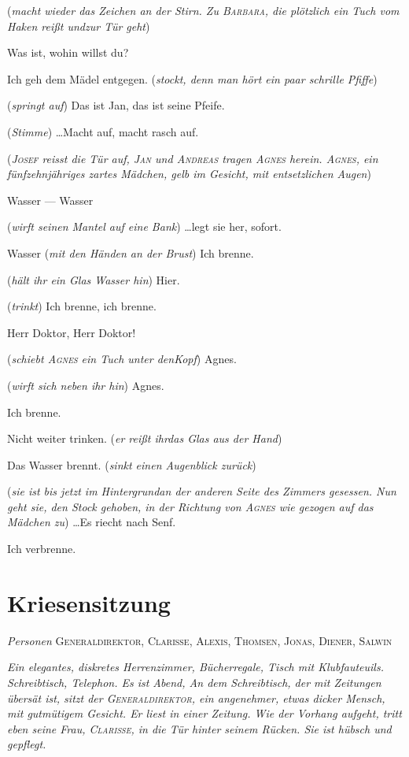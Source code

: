 \documentclass[
	final,
	a4paper,
	ngerman,
	mpinclude = true, %
	twoside = true,
	open = right,
	cleardoublepage = plain,
	DIV = 13,
	BCOR = 1cm,
	titlepage = firstiscover,
	]{scrbook}
\newcommand{\marginnote}[1]{\marginpar{\singlespacing\raggedright\footnotesize#1}}
\newcommand{\scene}{\setcounter{subscene}{1}\section}
\newcommand{\direction}[1]{(\textit{#1})}
\newcommand{\setting}[1]{\vspace{-0.5\baselineskip}\centering\textit{#1}}
\newcounter{subscene}
\newcommand{\characterlist}[1]{{\begin{center}\textit{Personen} #1\end{center}}}
\newcommand{\thecharacter}[1]{\textup{\textsc{#1}}\xspace}
\newcommand{\theBarbara}{\thecharacter{Barbara}}
\newcommand{\theJosef}{\thecharacter{Josef}}
\newcommand{\theKathrine}{\thecharacter{Kathrine}}
\newcommand{\theJan}{\thecharacter{Jan}}
\newcommand{\theAndreas}{\thecharacter{Andreas}}
\newcommand{\theLuise}{\thecharacter{Luise}}
\newcommand{\theAgnes}{\thecharacter{Agnes}}
\newcommand{\theGeneraldirektor}{\thecharacter{Generaldirektor}}
\newcommand{\theClarisse}{\thecharacter{Clarisse}}
\newcommand{\theAlexis}{\thecharacter{Alexis}}
\newcommand{\theThomsen}{\thecharacter{Thomsen}}
\newcommand{\theJonas}{\thecharacter{Jonas}}
\newcommand{\theSalwin}{\thecharacter{Salwin}}
\newcommand{\theDiener}{\thecharacter{Diener}}
\newcommand{\character}[1]{\item[#1]}
\newcommand{\Barbara}{\character{\theBarbara}}
\newcommand{\Josef}{\character{\theJosef}}
\newcommand{\Kathrine}{\character{\theKathrine}}
\newcommand{\Andreas}{\character{\theAndreas}}
\newcommand{\Luise}{\character{\theLuise}}
\newcommand{\Agnes}{\character{\theAgnes}}
\newcommand{\Thomsen}{\character{\theThomsen}}
\begin{document}
\begin{play}
\direction{macht wieder das Zeichen an der Stirn. Zu \theBarbara, die plötzlich ein Tuch vom Haken reißt undzur Tür geht}

Was ist, wohin willst du?

\Barbara
Ich geh dem Mädel entgegen. \direction{stockt, denn man hört ein paar schrille Pfiffe}

\Luise
\direction{springt auf} Das ist Jan, das ist seine Pfeife.

\Andreas
\direction{Stimme}
\ldots Macht auf, macht rasch auf.

\direction{\theJosef reisst die Tür auf, \theJan und \theAndreas tragen \theAgnes herein. \theAgnes, ein fünfzehnjähriges zartes Mädchen, gelb im Gesicht, mit entsetzlichen Augen}

\Agnes
Wasser --- Wasser

\Thomsen
\direction{wirft seinen Mantel auf eine Bank} \ldots legt sie her, sofort.

\Agnes
Wasser \direction{mit den Händen an der Brust} Ich brenne.

\Luise
\direction{hält ihr ein Glas Wasser hin} Hier.

\Agnes
\direction{trinkt} Ich brenne, ich brenne.

\Josef
Herr Doktor, Herr Doktor!

\Barbara
\direction{schiebt \theAgnes ein Tuch unter denKopf} Agnes.

\Andreas
\direction{wirft sich neben ihr hin} Agnes.

\Agnes
Ich brenne.

\Thomsen
Nicht weiter trinken. \direction{er reißt ihrdas Glas aus der Hand}

\Agnes
Das Wasser brennt. \direction{sinkt einen Augenblick zurück}

\Kathrine
\direction{sie ist bis jetzt im Hintergrundan der anderen Seite des Zimmers gesessen. Nun geht sie, den Stock gehoben, in der Richtung von \theAgnes wie gezogen auf das Mädchen zu} \ldots Es riecht nach Senf.

\Agnes
Ich verbrenne.

\end{play}



\scene{Kriesensitzung}
\characterlist{\theGeneraldirektor, \theClarisse, \theAlexis, \theThomsen, \theJonas, \theDiener, \theSalwin}
\marginnote{Ledersessel}
\setting{Ein elegantes, diskretes Herrenzimmer, Bücherregale, Tisch mit Klubfauteuils. Schreibtisch, Telephon. Es ist Abend, An dem Schreibtisch, der mit Zeitungen übersät ist, sitzt der \theGeneraldirektor, ein angenehmer, etwas dicker Mensch, mit gutmütigem Gesicht. Er liest in einer Zeitung. Wie der Vorhang aufgeht, tritt eben seine Frau, \theClarisse, in die Tür hinter seinem Rücken. Sie ist hübsch und gepflegt.}
\end{document}
